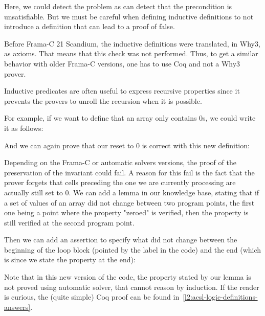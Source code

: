 Here, we could detect the problem as  can detect
that the precondition is unsatisfiable. But we must be careful when defining
inductive definitions to not introduce a definition that can lead to a proof
of false.


\begin{Warning}
  Before Frama-C 21 Scandium, the inductive definitions were translated, in
  Why3, as axioms. That means that this check was not performed. Thus, to
  get a similar behavior with older Frama-C versions, one has to use Coq
  and not a Why3 prover.
\end{Warning}



Inductive predicates are often useful to express recursive properties since it
prevents the provers to unroll the recursion when it is possible.

For example, if we want to define that an array only contains 0s, we could
write it as follows:




And we can again prove that our reset to 0 is correct with this new
definition:


Depending on the Frama-C or automatic solvers versions, the proof of the
preservation of the invariant could fail. A reason for this fail is the fact that
the prover forgets that cells preceding the one we are currently processing
are actually still set to 0. We can add a lemma in our knowledge base, stating
that if a set of values of an array did not change between two program points,
the first one being a point where the property "zeroed" is verified, then the
property is still verified at the second program point.




Then we can add an assertion to specify what did not change between the
beginning of the loop block (pointed by the label  in the code)
and the end (which is  since we state the property at the end):




Note that in this new version of the code, the property stated by our lemma is
not proved using automatic solver, that cannot reason by induction. If the
reader is curious, the (quite simple) Coq proof can be found
in~\ref{l2:acsl-logic-definitions-answers}.


